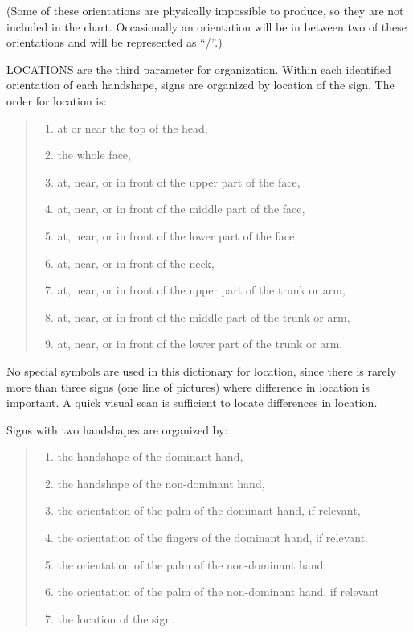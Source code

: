 \documentclass{tufte-book}
\begin{document}
\begin{fullwidth}
\noindent (Some of these orientations are physically impossible to produce, so they are not included in the chart. Occasionally an orientation will be in between two of these orientations and will be represented as “/”.)

\vspace{0.25cm}LOCATIONS are the third parameter for organization. Within each identified orientation of each handshape, signs are organized by location of the sign. The order for location is:
\begin{quote}
\begin{enumerate}
\item at or near the top of the head,
\item the whole face,
\item at, near, or in front of the upper part of the face,
\item at, near, or in front of the middle part of the face,
\item at, near, or in front of the lower part of the face,
\item at, near, or in front of the neck,
\item at, near, or in front of the upper part of the trunk or arm,
\item at, near, or in front of the middle part of the trunk or arm,
\item at, near, or in front of the lower part of the trunk or arm.
\end{enumerate}
\end{quote}

No special symbols are used in this dictionary for location, since there is rarely more than three signs (one line of pictures) where difference in location is important. A quick visual scan is sufficient to locate differences in location.

Signs with two handshapes are organized by:
\begin{quote}
\begin{enumerate}
\item the handshape of the dominant hand,
\item the handshape of the non-dominant hand,
\item the orientation of the palm of the dominant hand, if relevant,
\item the orientation of the fingers of the dominant hand, if relevant.
\item the orientation of the palm of the non-dominant hand,
\item the orientation of the palm of the non-dominant hand, if relevant
\item the location of the sign.
\end{enumerate}
\end{quote}


\end{fullwidth}
\end{document}
